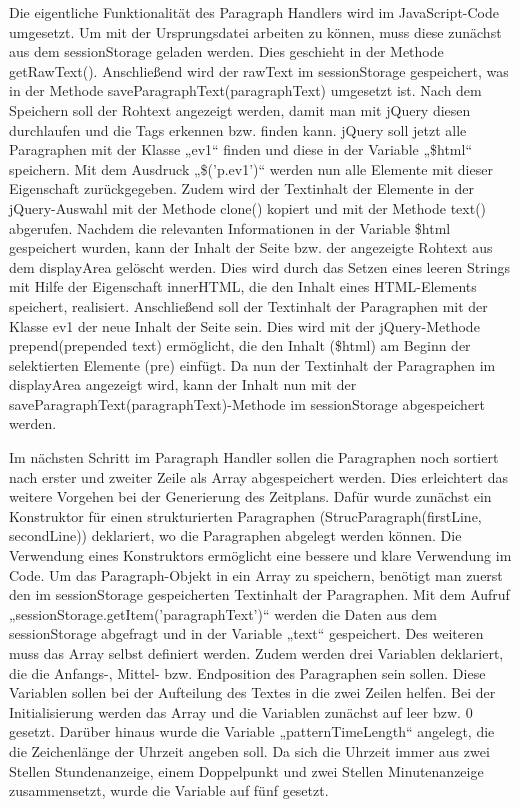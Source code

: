Die eigentliche Funktionalität des Paragraph Handlers wird im JavaScript-Code umgesetzt. Um mit der Ursprungsdatei arbeiten zu können, muss diese zunächst aus dem sessionStorage geladen werden. Dies geschieht in der Methode getRawText(). Anschließend wird der rawText im sessionStorage gespeichert, was in der Methode saveParagraphText(paragraphText) umgesetzt ist. Nach dem Speichern soll der Rohtext angezeigt werden, damit man mit jQuery diesen durchlaufen und die Tags erkennen bzw. finden kann. jQuery soll jetzt alle Paragraphen mit der Klasse „ev1“ finden und diese in der Variable „\$html“ speichern. Mit dem Ausdruck „\$('p.ev1')“ werden nun alle Elemente mit dieser Eigenschaft zurückgegeben. Zudem wird der Textinhalt der Elemente in der jQuery-Auswahl mit der Methode clone() kopiert und mit der Methode text() abgerufen. Nachdem die relevanten Informationen in der Variable \$html gespeichert wurden, kann der Inhalt der Seite bzw. der angezeigte Rohtext aus dem displayArea gelöscht werden. Dies wird durch das Setzen eines leeren Strings mit Hilfe der Eigenschaft innerHTML, die den Inhalt eines HTML-Elements speichert, realisiert. Anschließend soll der Textinhalt der Paragraphen mit der Klasse ev1 der neue Inhalt der Seite sein. Dies wird mit der jQuery-Methode prepend(prepended text) ermöglicht, die den Inhalt (\$html) am Beginn der selektierten Elemente (pre) einfügt. Da nun der Textinhalt der Paragraphen im displayArea angezeigt wird, kann der Inhalt nun mit der saveParagraphText(paragraphText)-Methode im sessionStorage abgespeichert werden.

Im nächsten Schritt im Paragraph Handler sollen die Paragraphen noch sortiert nach erster und zweiter Zeile als Array abgespeichert werden. Dies erleichtert das weitere Vorgehen bei der Generierung des Zeitplans. Dafür wurde zunächst ein Konstruktor für einen strukturierten Paragraphen (StrucParagraph(firstLine, secondLine)) deklariert, wo die Paragraphen abgelegt werden können. Die Verwendung eines Konstruktors ermöglicht eine bessere und klare Verwendung im Code. Um das Paragraph-Objekt in ein Array zu speichern, benötigt man zuerst den im sessionStorage gespeicherten Textinhalt der Paragraphen. Mit dem Aufruf „sessionStorage.getItem('paragraphText')“ werden die Daten aus dem sessionStorage abgefragt und in der Variable „text“ gespeichert. Des weiteren muss das Array selbst definiert werden. Zudem werden drei Variablen deklariert, die die Anfangs-, Mittel- bzw. Endposition des Paragraphen sein sollen. Diese Variablen sollen bei der Aufteilung des Textes in die zwei Zeilen helfen. Bei der Initialisierung werden das Array und die Variablen zunächst auf leer bzw. 0 gesetzt. Darüber hinaus wurde die Variable „patternTimeLength“ angelegt, die die Zeichenlänge der Uhrzeit angeben soll. Da sich die Uhrzeit immer aus zwei Stellen Stundenanzeige, einem Doppelpunkt und zwei Stellen Minutenanzeige zusammensetzt, wurde die Variable auf fünf gesetzt.

